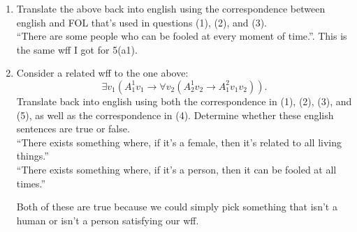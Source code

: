 \documentclass[11pt]{article}
\newcommand{\n}{\vspace{0.3cm}}
\begin{document}
\begin{enumerate}
    \item Translate the above back into english using the correspondence between english and FOL that's used in questions (1), (2), and (3). \n\\
      ``There are some people who can be fooled at every moment of time.''.  This is the same wff I got for 5(a1).

    \item Consider a related wff to the one above:
      \[\exists v_1 (A_1^1v_1 \to \forall v_2 (A_2^1v_2 \to A_1^2v_1v_2)).\]
      Translate back into english using both the correspondence in (1), (2), (3), and (5), as well as the correspondence in (4).  Determine whether these english sentences are true or false. \n\\
      ``There exists something where, if it's a female, then it's related to all living things.'' \\
      ``There exists something where, if it's a person, then it can be fooled at all times.'' \n

      Both of these are true because we could simply pick something that isn't a human or isn't a person satisfying our wff.
  \end{enumerate}
\end{document}

